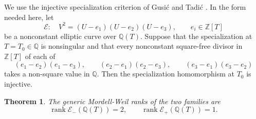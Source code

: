 \documentclass[11pt]{amsart}
\newtheorem{theorem}{Theorem}[section]
\theoremstyle{remark}
\newcommand{\Q}{\mathbb{Q}}
\newcommand{\Z}{\mathbb{Z}}
\begin{document}
We use the injective specialization criterion of Gusi\'c and Tadi\'c
\cite{GusicTadic}.  In the form needed here, let 
\[
 \mathcal E:\quad V^2=(U-e_1)(U-e_2)(U-e_3),
 \qquad e_i\in\Z[T]
\]
be a nonconstant elliptic curve over $\Q(T)$. 
Suppose that the specialization at 
$T=T_0\in\Q$ is nonsingular and that every nonconstant square-free divisor in $\Z[T]$ of each of
\[
 (e_1-e_2)(e_1-e_3),\qquad
 (e_2-e_1)(e_2-e_3),\qquad
 (e_3-e_1)(e_3-e_2)
\]
takes a non-square value in $\Q$. Then the specialization homomorphism at $T_0$ is
injective.

\begin{theorem}\label{genericrank}
The generic Mordell-Weil ranks of the two families are
\[
 \operatorname{rank}\mathcal E_-(\Q(T))=2,\qquad
 \operatorname{rank}\mathcal E_+(\Q(T))=1.
\]
\end{theorem}
\end{document}
